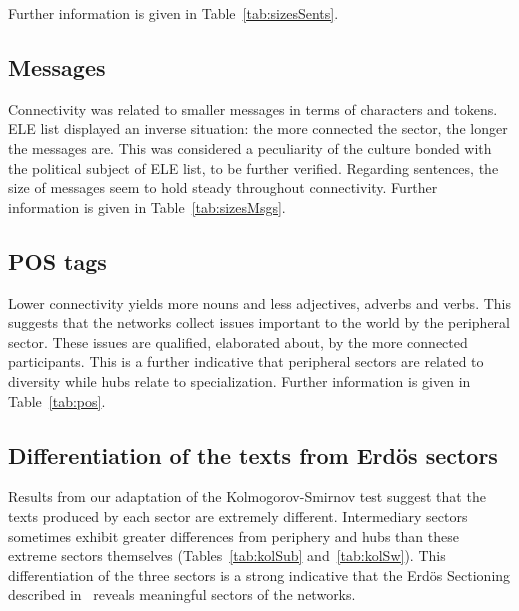 \documentclass[%
 aip,
 jmp,%
 amsmath,amssymb,
 reprint,%
]{revtex4-1}
\begin{document}
Further information is given in Table~\ref{tab:sizesSents}.

\subsection{Messages}\label{subsec:mm}
Connectivity was related to smaller messages in terms of characters and tokens.
ELE list displayed an inverse situation:
the more connected the sector,
the longer the messages are.
This was considered a peculiarity of the culture bonded
with the political subject of ELE list, to be further verified.
Regarding sentences,
the size of messages seem to hold steady throughout connectivity.
Further information is given in Table~\ref{tab:sizesMsgs}.

\subsection{POS tags}\label{subsec:pos}
Lower connectivity yields more nouns and less adjectives,
adverbs and verbs.
This suggests that the networks collect issues important
to the world by the peripheral sector. 
These issues are qualified, elaborated about,
by the more connected participants.
This is a further indicative that peripheral sectors
are related to diversity while hubs relate to specialization.
Further information is given in Table~\ref{tab:pos}.

\subsection{Differentiation of the texts from Erd\"os sectors}\label{subsec:di}
Results from our adaptation of the Kolmogorov-Smirnov test
suggest that the texts produced by each sector are extremely different.
Intermediary sectors sometimes exhibit greater differences 
from periphery and hubs than these extreme sectors themselves 
(Tables~\ref{tab:kolSub} and~\ref{tab:kolSw}).
This differentiation of the three sectors is a
strong indicative that the Erd\"os Sectioning
described in~\cite{evoSN} reveals meaningful
sectors of the networks.
\end{document}
